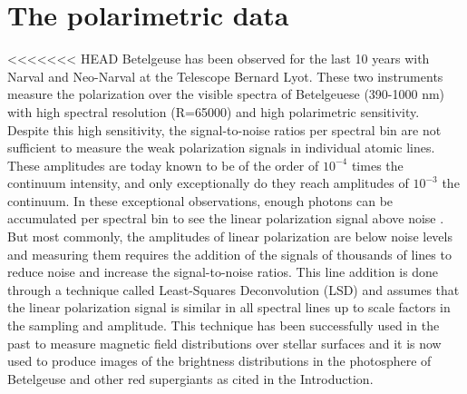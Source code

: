 \documentclass{aa}
\begin{document}
\section{The polarimetric data}
\label{Section 2}

<<<<<<< HEAD
Betelgeuse has been observed for the last 10 years with Narval and Neo-Narval at the Telescope Bernard Lyot. These two instruments measure the polarization 
over the visible spectra of Betelgeuese (390-1000 nm) with high spectral resolution (R=65000) and high polarimetric sensitivity. Despite 
this high sensitivity, the signal-to-noise ratios per spectral bin are not sufficient to measure the weak polarization signals in individual 
atomic lines. These amplitudes are today known to be of the order of $10^{-4}$ times the continuum intensity, and only exceptionally do they 
reach amplitudes of $10^{-3}$ the continuum. In these exceptional observations, enough photons can be accumulated per spectral bin to 
see the linear polarization signal above noise \citep{auriere_discovery_2016}. But most commonly, the amplitudes of linear polarization are 
below noise levels and measuring them requires the addition of the signals of thousands of lines to reduce  noise and increase the 
signal-to-noise ratios. This line addition 
is done through a technique called Least-Squares Deconvolution (LSD) \citep{donati_spectropolarimetric_1997} and assumes that the 
linear polarization signal is similar 
in all spectral lines up to scale factors in the sampling and amplitude. This technique has been successfully used in the past to measure 
magnetic field distributions over stellar surfaces and it is now used to produce images of the brightness distributions in the photosphere 
of Betelgeuse and other red supergiants as cited in the Introduction. 
\end{document}
